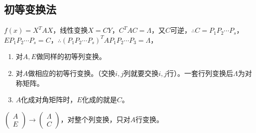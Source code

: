 \documentclass[UTF8, 12pt]{ctexart}
\begin{document}
\subsection{初等变换法}

$f(x)=X^TAX$，线性变换$X=CY$，$C^TAC=\Lambda$，又$C$可逆，$\therefore C=P_1P_2\cdots P_s$，$EP_1P_2\cdots P_s=C$，$\therefore(P_1P_2\cdots P_s)^TAP_1P_2\cdots P_3=\Lambda$，

\begin{enumerate}
    \item 对$A,E$做同样的初等列变换。
    \item 对$A$做相应的初等行变换。（交换$i,j$列就要交换$i,j$行）。一套行列变换后$\Lambda$为对称矩阵。
    \item $A$化成对角矩阵时，$E$化成的就是$C$。
\end{enumerate}

$\left(\begin{array}{c}
    A \\
    E
\end{array}\right)\rightarrow\left(\begin{array}{c}
    \Lambda \\
    C
\end{array}\right)$，对整个列变换，只对$A$行变换。
\end{document}
